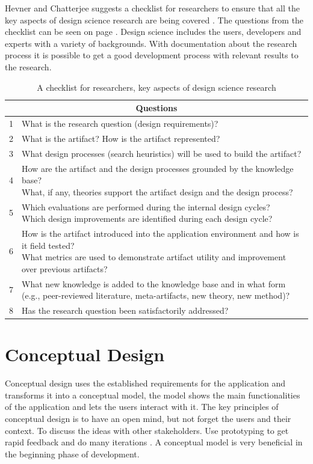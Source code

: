 Hevner and Chatterjee suggests a checklist for researchers to ensure that all the key aspects of design science research are being covered \cite{Hevner2010}. The questions from the checklist can be seen on page \pageref{tab:1} . Design science includes the users, developers and experts with a variety of backgrounds. With documentation about the research process it is possible to get a good development process with relevant results to the research.

\newpage
\begin{table}[H]
\begin{tabular}{ |l|l| }
  \hline
  \multicolumn{2}{|c|}{Questions} \\
  \hline
1 & What is the research question (design requirements)?\\ 
\hline
2 & What is the artifact? How is the artifact represented?\\
\hline
3 & What design processes (search heuristics) will be used to build the artifact?\\ 
\hline
4 &\makecell[l]{ How are the artifact and the design processes grounded by the knowledge base? \\What, if any, theories support the artifact design and the design process?} \\
\hline
5 &\makecell[l]{ Which evaluations are performed during the internal design cycles?\\ Which design improvements are identified during each design cycle?}\\ 
\hline
6 & \makecell[l]{How is the artifact introduced into the application environment and how is it field tested?\\ What metrics are used to demonstrate artifact utility and improvement over previous artifacts?}\\ 
\hline
7 &\makecell[l]{ What new knowledge is added to the knowledge base and in what form \\ (e.g., peer-reviewed literature, meta-artifacts, new theory, new method)?}\\ 
\hline
8 & Has the research question been satisfactorily addressed?\\
 \hline
  
\end{tabular}
\label{tab:1}
\caption{A checklist for researchers, key aspects of design science research}
\end{table}

\section{Conceptual Design}
Conceptual design uses the established requirements for the application and transforms it into a conceptual model\cite{interactiondesignbook}, the model shows the main functionalities of the application and lets the users interact with it. The key principles of conceptual design is to have an open mind, but not forget the users and their context. To discuss the ideas with other stakeholders. Use prototyping to get rapid feedback and do many iterations \cite{interactiondesignbook}. A conceptual model is very beneficial in the beginning phase of development.
